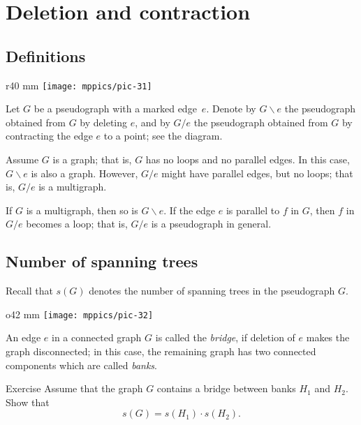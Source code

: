 \chapter{Deletion and contraction}
\label{Deletion and contraction}

\section*{Definitions}


\begin{wrapfigure}{r}{40 mm}
\vskip-12mm
\centering
\texttt{[image: mppics/pic-31]}
\vskip-0mm
\end{wrapfigure}

Let $G$ be a pseudograph with a marked edge~$e$.
Denote by $G\backslash e$ the pseudograph obtained from $G$ by deleting $e$,
and by $G/e$ the pseudograph obtained from $G$ by contracting the edge $e$ to a point; see the diagram.

Assume $G$ is a graph; that is, $G$ has no loops and no parallel edges.
In this case, $G\backslash e$ is also a graph.
However, $G/e$ might have parallel edges, but no loops; that is, $G/e$ is a multigraph.

If $G$ is a multigraph, then so is $G\backslash e$.
If the edge $e$ is parallel to $f$ in $G$, then $f$ in $G/e$ becomes a loop; that is, $G/e$ is a pseudograph in general.


\section*{Number of spanning trees}

Recall that $s(G)$ denotes the number of spanning trees in the pseudograph $G$.

{
\begin{wrapfigure}{o}{42 mm}
\vskip-4mm
\centering
\texttt{[image: mppics/pic-32]}
\vskip-0mm
\end{wrapfigure}

An edge $e$ in a connected graph $G$ is called the \emph{bridge}, if deletion of $e$ makes the graph disconnected;
in this case, the remaining graph has two connected components which are called {}\emph{banks}.


\begin{thm}{Exercise}
Assume that the graph $G$ contains a bridge between banks $H_1$ and $H_2$.
Show that
\[s(G)=s(H_1)\cdot s(H_2).\]
\end{thm}

}


